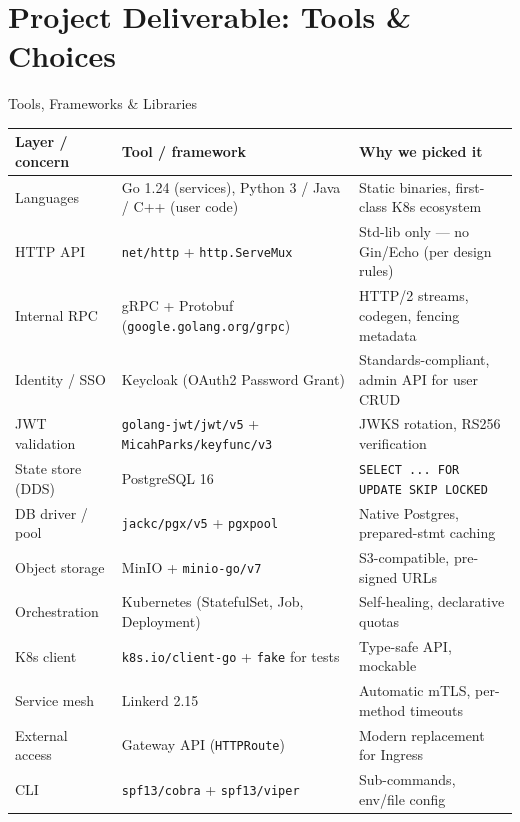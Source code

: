 \documentclass[11pt]{beamer}
\begin{document}
\section{Project Deliverable: Tools \& Choices}

\begin{frame}{Tools, Frameworks \& Libraries}
\scriptsize
\begin{table}
\centering
\begin{tabular}{lll}
\toprule
Layer / concern & Tool / framework & Why we picked it \\
\midrule
Languages          & \alert{Go 1.24} (services), Python 3 / Java / C++ (user code) & Static binaries, first-class K8s ecosystem \\
HTTP API           & \texttt{net/http} + \texttt{http.ServeMux} & Std-lib only --- no Gin/Echo (per design rules) \\
Internal RPC       & \alert{gRPC} + Protobuf (\texttt{google.golang.org/grpc})       & HTTP/2 streams, codegen, fencing metadata \\
Identity / SSO     & \alert{Keycloak} (OAuth2 Password Grant)                        & Standards-compliant, admin API for user CRUD \\
JWT validation     & \texttt{golang-jwt/jwt/v5} + \texttt{MicahParks/keyfunc/v3}     & JWKS rotation, RS256 verification \\
State store (DDS)  & \alert{PostgreSQL 16}                                            & \texttt{SELECT ... FOR UPDATE SKIP LOCKED} \\
DB driver / pool   & \texttt{jackc/pgx/v5} + \texttt{pgxpool}                         & Native Postgres, prepared-stmt caching \\
Object storage     & \alert{MinIO} + \texttt{minio-go/v7}                             & S3-compatible, pre-signed URLs \\
Orchestration      & \alert{Kubernetes} (StatefulSet, Job, Deployment)                & Self-healing, declarative quotas \\
K8s client         & \texttt{k8s.io/client-go} + \texttt{fake} for tests              & Type-safe API, mockable \\
Service mesh       & \alert{Linkerd 2.15}                                             & Automatic mTLS, per-method timeouts \\
External access    & \alert{Gateway API} (\texttt{HTTPRoute})                         & Modern replacement for Ingress \\
CLI                & \texttt{spf13/cobra} + \texttt{spf13/viper}                      & Sub-commands, env/file config \\

\end{tabular}
\end{table}
\end{frame}
\end{document}
